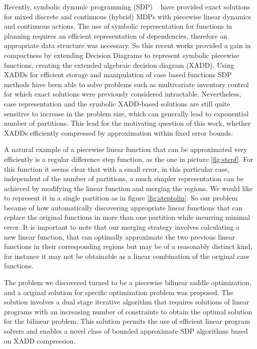 Recently, symbolic dynamic programming (SDP) ~\cite{sanner_uai11} have provided exact solutions for mixed discrete and continuous (hybrid) MDPs with piecewise linear dynamics and continuous actions\cite{zamani12}. The use of symbolic representation for functions in planning requires an efficient representation of dependencies, therefore an appropriate data structure was necessary. So this recent works provided a gain in compactness by extending Decision Diagrams to represent symbolic piecewise functions, creating the extended algebraic decision diagram (XADD). Using XADDs for efficient storage and manipulation of case based functions SDP methods have been able to solve problems such as multivariate inventory control for which exact solutions were previously considered intractable. Nevertheless, case representation and the symbolic XADD-based solutions are still quite sensitive to increase in the problem size, which can generally lead to exponential number of partitions. This lead for the motivating question of this work, whether XADDs efficiently compressed by approximation within fixed error bounds.

 A natural example of a piecewise linear function that can be approximated very efficiently is a regular difference step function, as the one in picture \ref{fig:stepf}. For this function it seems clear that with a small error, in this particular case, independent of the number of partitions, a much simpler representation can be achieved by modifying the linear function and merging the regions. We would like to represent it in a single partition as in figure \ref{fig:steptolin}. So our problem became of how automatically discovering appropriate linear functions that can replace the original functions in more than one partition while incurring minimal error. It is important to note that our merging strategy involves calculating a new linear function, that can optimally approximate the two previous linear functions in their corresponding regions but may be of a reasonably distinct kind, for instance it may not be obtainable as a linear combination of the original case functions.
 
The problem we discovered turned to be a piecewise bilinear saddle optimization, and a original solution for specific optimization problem was proposed. The solution involves a dual stage iterative algorithm that requires solutions of linear programs with an increasing number of constraints to obtain the optimal solution for the bilinear problem. This solution permits
the use of efficient linear program solvers and enables a novel class
of bounded approximate SDP algorithms based on XADD compression.

